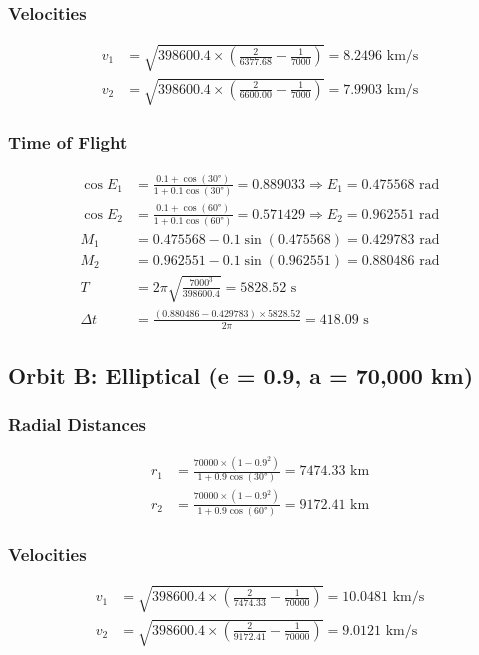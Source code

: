 \documentclass[12pt,a4paper]{article}
\begin{document}
\subsubsection{Velocities}
\begin{align}
v_1 &= \sqrt{398600.4 \times \left(\frac{2}{6377.68} - \frac{1}{7000}\right)} = 8.2496 \text{ km/s} \\
v_2 &= \sqrt{398600.4 \times \left(\frac{2}{6600.00} - \frac{1}{7000}\right)} = 7.9903 \text{ km/s}
\end{align}

\subsubsection{Time of Flight}
\begin{align}
\cos E_1 &= \frac{0.1 + \cos(30°)}{1 + 0.1\cos(30°)} = 0.889033 \Rightarrow E_1 = 0.475568 \text{ rad} \\
\cos E_2 &= \frac{0.1 + \cos(60°)}{1 + 0.1\cos(60°)} = 0.571429 \Rightarrow E_2 = 0.962551 \text{ rad} \\
M_1 &= 0.475568 - 0.1\sin(0.475568) = 0.429783 \text{ rad} \\
M_2 &= 0.962551 - 0.1\sin(0.962551) = 0.880486 \text{ rad} \\
T &= 2\pi\sqrt{\frac{7000^3}{398600.4}} = 5828.52 \text{ s} \\
\Delta t &= \frac{(0.880486 - 0.429783) \times 5828.52}{2\pi} = 418.09 \text{ s}
\end{align}

\subsection{Orbit B: Elliptical (e = 0.9, a = 70,000 km)}

\subsubsection{Radial Distances}
\begin{align}
r_1 &= \frac{70000 \times (1-0.9^2)}{1+0.9\cos(30°)} = 7474.33 \text{ km} \\
r_2 &= \frac{70000 \times (1-0.9^2)}{1+0.9\cos(60°)} = 9172.41 \text{ km}
\end{align}

\subsubsection{Velocities}
\begin{align}
v_1 &= \sqrt{398600.4 \times \left(\frac{2}{7474.33} - \frac{1}{70000}\right)} = 10.0481 \text{ km/s} \\
v_2 &= \sqrt{398600.4 \times \left(\frac{2}{9172.41} - \frac{1}{70000}\right)} = 9.0121 \text{ km/s}
\end{align}
\end{document}
